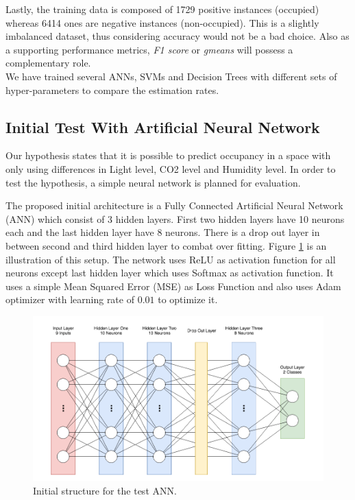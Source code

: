 \documentclass[conference]{IEEEtran}
\begin{document}
Lastly, the training data is composed of 1729 positive instances (occupied) whereas 6414 ones are negative instances (non-occupied). This is a slightly imbalanced dataset, thus considering accuracy would not be a bad choice. Also as a supporting performance metrics, \textit{F1 score} or \textit{gmeans} will possess a complementary role.\\

We have trained several ANNs, SVMs and Decision Trees with different sets of hyper-parameters to compare the estimation rates.


\subsection{Initial Test With Artificial Neural Network}

Our hypothesis states that it is possible to predict occupancy in a space with only using differences in Light level, CO2 level and Humidity level. In order to test the hypothesis, a simple neural network is planned for evaluation.

The proposed initial architecture is a Fully Connected Artificial Neural Network (ANN) which consist of 3 hidden layers. First two hidden layers have 10 neurons each and the last hidden layer have 8 neurons. There is a drop out layer in between second and third hidden layer to combat over fitting. Figure \ref{fig:ann-struct} is an illustration of this setup. The network uses ReLU as activation function for all neurons except last hidden layer which uses Softmax as activation function. It uses a simple Mean Squared Error (MSE) as Loss Function and also uses Adam optimizer \cite{Adam} with learning rate of $0.01$ to optimize it.

\begin{figure}[H]
	\includegraphics[width=1\columnwidth]{ann-struct.png}
	\caption{Initial structure for the test ANN.}
	\label{fig:ann-struct}
\end{figure}
\end{document}
